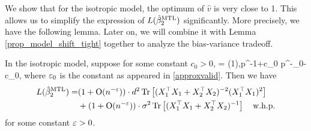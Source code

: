 We show that for the isotropic model, the optimum of $\hat v$ is very close to 1.
This allows us to simplify the expression of $L(\hat{\beta}_2^{\text{MTL}})$ significantly.
More precisely, we have the following lemma.
Later on, we will combine it with Lemma \ref{prop_model_shift_tight} together to analyze the bias-variance tradeoff.

\begin{lemma}
In the isotropic model, suppose for some constant $c_0>0$, 
\be\label{choiceofpara}
	 = \OO(1),\quad p^{-1+c_0} \le {}  \le p^{-\e_0-c_0},
\ee
where ${\varepsilon}_0$ is the constant as appeared in \eqref{approxvalid}. Then we have
\begin{align}
L(\hat{\beta}_2^{\text{MTL}})=&(1+\operatorname{O}(n^{-{\varepsilon}}))\cdot d^2 \operatorname{Tr}\left[(X_1^{\top}X_1 +X_2^{\top}X_2)^{-2} (X_1^{\top}X_1)^2\right] \nonumber \\
&+(1+\operatorname{O}(n^{-{\varepsilon}}))\cdot \sigma^2  \operatorname{Tr}\left[(X_1^{\top}X_1  + X_2^{\top}X_2)^{-1} \right] \quad \text{w.h.p.} \label{simple1}
\end{align}
for some constant ${\varepsilon}>0$.
\end{lemma}

